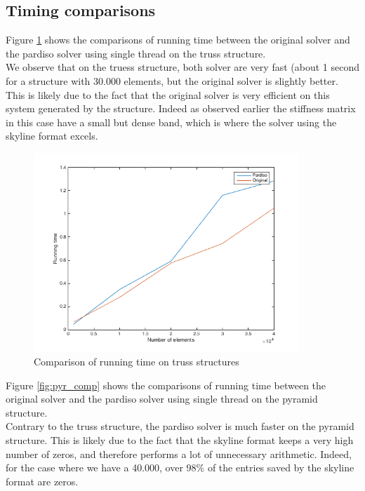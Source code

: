 \documentclass[11pt]{article}
\begin{document}
\subsection{Timing comparisons}
Figure \ref{fig:chaincomp} shows the comparisons of running time between the original solver and the pardiso solver using single thread  on the truss structure. \\

We observe that on the truess structure, both solver are very fast (about 1 second for a structure with 30.000 elements, but the original solver is slightly better. This is likely due to the fact that the original solver is very efficient on this system generated by the structure. Indeed as observed earlier the stiffness matrix in this case have a small but dense band, which is where the solver using the skyline format excels.


\begin{figure}[H]
\begin{center}

\includegraphics[width=10cm]{chainplot}
\caption{Comparison of running time on truss structures}
\label{fig:chaincomp}
\end{center}
\end{figure}

Figure \ref{fig:pyr_comp} shows the comparisons of running time between the original solver and the pardiso solver using single thread on the pyramid structure. \\

Contrary to the truss structure, the pardiso solver is much faster on the pyramid structure. This is likely due to the fact that the skyline format keeps a very high number of zeros, and therefore performs a lot of unnecessary arithmetic. Indeed, for the case where we have a 40.000, over $98\%$ of the entries saved by the skyline format are zeros.
\end{document}
